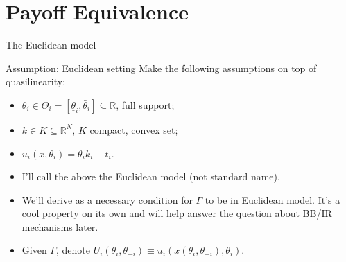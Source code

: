 \documentclass[english,10pt
,aspectratio=169
,handout
]{beamer}
\begin{document}
\section{Payoff Equivalence}

\begin{frame}{The Euclidean model}
\begin{alertblock}{Assumption: Euclidean setting}
	Make the following assumptions on top of quasilinearity:
	\begin{itemize}
		\item $\theta_i \in \Theta_{i} = [\underline{\theta}_i, \bar{\theta}_i] \subseteq \mathbb{R}$, full support;
		\item $k \in K \subseteq \mathbb{R}^N$, $K$ compact, convex set;
		\item $u_i(x,\theta_i) = \theta_i k_i - t_i$.
	\end{itemize}
\end{alertblock}
\begin{itemize}
	\item I'll call the above \alert{the Euclidean model} (not standard name).
	\item We'll derive  as a necessary condition for $\Gamma$ to be  in \alert{Euclidean} model. It's a cool property on its own and will help answer the question about BB/IR mechanisms later.
	\item Given $\Gamma$, denote $U_i(\theta_i, \theta_{-i}) \equiv u_i\left(x(\theta_i, \theta_{-i}), \theta_i \right)$.
\end{itemize}
\end{frame}
\end{document}
